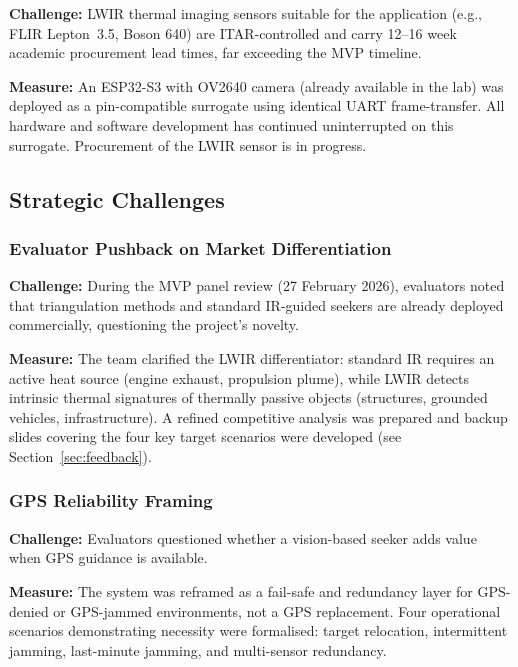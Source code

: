\documentclass[12pt,a4paper]{article}
\begin{document}
\textbf{Challenge:} LWIR thermal imaging sensors suitable for the application (e.g., FLIR Lepton~3.5, Boson 640) are ITAR-controlled and carry 12--16 week academic procurement lead times, far exceeding the MVP timeline.

\textbf{Measure:} An ESP32-S3 with OV2640 camera (already available in the lab) was deployed as a pin-compatible surrogate using identical UART frame-transfer. All hardware and software development has continued uninterrupted on this surrogate. Procurement of the LWIR sensor is in progress.

\subsection{Strategic Challenges}

\subsubsection{Evaluator Pushback on Market Differentiation}

\textbf{Challenge:} During the MVP panel review (27 February 2026), evaluators noted that triangulation methods and standard IR-guided seekers are already deployed commercially, questioning the project's novelty.

\textbf{Measure:} The team clarified the LWIR differentiator: standard IR requires an active heat source (engine exhaust, propulsion plume), while LWIR detects intrinsic thermal signatures of thermally passive objects (structures, grounded vehicles, infrastructure). A refined competitive analysis was prepared and backup slides covering the four key target scenarios were developed (see Section~\ref{sec:feedback}).

\subsubsection{GPS Reliability Framing}

\textbf{Challenge:} Evaluators questioned whether a vision-based seeker adds value when GPS guidance is available.

\textbf{Measure:} The system was reframed as a fail-safe and redundancy layer for GPS-denied or GPS-jammed environments, not a GPS replacement. Four operational scenarios demonstrating necessity were formalised: target relocation, intermittent jamming, last-minute jamming, and multi-sensor redundancy.

\end{document}
